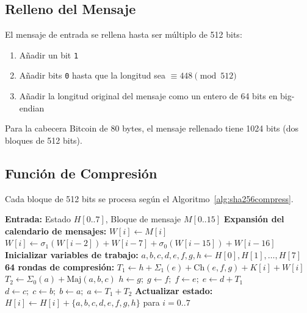 \documentclass[12pt,a4paper]{article}
\begin{document}
\subsection{Relleno del Mensaje}

El mensaje de entrada se rellena hasta ser m\'ultiplo de 512 bits:
\begin{enumerate}[leftmargin=2em]
    \item A\~nadir un bit \texttt{1}
    \item A\~nadir bits \texttt{0} hasta que la longitud sea $\equiv 448 \pmod{512}$
    \item A\~nadir la longitud original del mensaje como un entero de 64 bits en big-endian
\end{enumerate}

Para la cabecera Bitcoin de 80 bytes, el mensaje rellenado tiene 1024 bits
(dos bloques de 512 bits).

\subsection{Funci\'on de Compresi\'on}

Cada bloque de 512 bits se procesa seg\'un el Algoritmo~\ref{alg:sha256compress}.

\begin{algorithm}[H]
    \caption{Compresi\'on SHA-256 (un bloque de 64 bytes)}
    \label{alg:sha256compress}
    \begin{algorithmic}[1]
        \STATE \textbf{Entrada:} Estado $H[0..7]$, Bloque de mensaje $M[0..15]$
        \STATE \textbf{Expansi\'on del calendario de mensajes:}
            \STATE $W[i] \leftarrow M[i]$
        \ENDFOR
            \STATE $W[i] \leftarrow \sigma_1(W[i{-}2]) + W[i{-}7] + \sigma_0(W[i{-}15]) + W[i{-}16]$
        \ENDFOR
        \STATE \textbf{Inicializar variables de trabajo:}
        \STATE $a,b,c,d,e,f,g,h \leftarrow H[0],H[1],\ldots,H[7]$
        \STATE \textbf{64 rondas de compresi\'on:}
            \STATE $T_1 \leftarrow h + \Sigma_1(e) + \text{Ch}(e,f,g) + K[i] + W[i]$
            \STATE $T_2 \leftarrow \Sigma_0(a) + \text{Maj}(a,b,c)$
            \STATE $h \leftarrow g;\; g \leftarrow f;\; f \leftarrow e;\; e \leftarrow d + T_1$
            \STATE $d \leftarrow c;\; c \leftarrow b;\; b \leftarrow a;\; a \leftarrow T_1 + T_2$
        \ENDFOR
        \STATE \textbf{Actualizar estado:}
        \STATE $H[i] \leftarrow H[i] + \{a,b,c,d,e,f,g,h\}$ para $i = 0..7$
    \end{algorithmic}
\end{algorithm}
\end{document}
